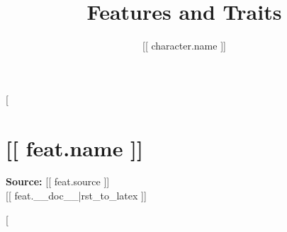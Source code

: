 \documentclass[twocolumn,lettersize]{article}
\title{Features and Traits}
\author{[[ character.name ]]}
\date{}
\begin{document}
\maketitle

[%

  \section*{[[ feat.name ]]}
             
  \noindent
  \textbf{Source:} [[ feat.source ]] \\

  [[ feat.__doc__|rst_to_latex ]]

[%
\end{document}
